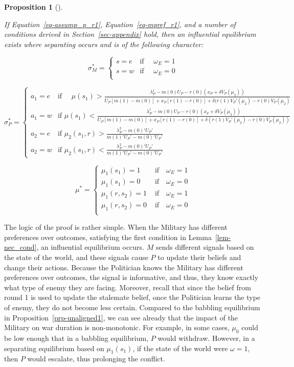\documentclass[
  12pt,
]{article}
\theoremstyle{plain}
\theoremstyle{plain}
\newtheorem{proposition}{Proposition}[section]
\theoremstyle{remark}
\begin{document}
\begin{proposition}[]\protect\hypertarget{prp-aligned1}{}\label{prp-aligned1}

If Equation~\ref{eq-assump_p_r1}, Equation~\ref{eq-mpref_r1}, and a
number of conditions derived in Section~\ref{sec-appendix} hold, then an
influential equilibrium exists where separating occurs and is of the
following character:

\[
\sigma^{*}_M = 
\begin{cases}
s = e  & \text{if } \quad \omega_E = 1\\
s = w  & \text{if } \quad \omega_E = 0 \\
\end{cases}
\]

\[
\sigma^{*}_P = 
\begin{cases}
a_1= e  & \text{if } \quad\mu(s_1)
> \frac{\lambda^1_P - m(0)U_P - r(0)(x_P + \delta V_P(\mu_2))}
 {U_P[ m(1) - m(0) ]+ x_P [r(1) -r(0)] 
 + \delta (r(1)V_P'(\mu_2) - r(0)V_P(\mu_2)}\\
a_1 = w  & \text{if } \mu(s_1)
< \frac{\lambda^1_P - m(0)U_P - r(0)(x_p + \delta V_P(\mu_2))}
 {U_P[ m(1) - m(0) ]+ x_P [r(1) -r(0)] 
 + \delta (r(1)V_P'(\mu_2) - r(0)V_P(\mu_2))}\\
a_2 = e & \text{if } \mu_2(s_1, r) > \frac{\lambda^2_P - m(0)' U_P '}{m(1)' U_P' - m(0)' U_P'}\\
a_2 = w & \text{if } \mu_2(s_1, r) < \frac{\lambda^2_P - m(0)' U_P '}{m(1)' U_P' - m(0)' U_P'}
\end{cases}
\]

\[
\mu^* = 
\begin{cases}
\mu_1(s_1) = 1 & \text{ if} \quad \omega_E = 1\\
\mu_1(s_1) = 0 & \text{ if} \quad \omega_E = 0\\
\mu_1(r, s_2) = 1 & \text{ if} \quad \omega_E = 1\\
\mu_1(r, s_2) = 0 & \text{ if} \quad \omega_E = 0\\
\end{cases}
\]

\end{proposition}

The logic of the proof is rather simple. When the Military has different
preferences over outcomes, satisfying the first condition in
Lemma~\ref{lem-nec_cond}, an influential equilibrium occurs. \(M\) sends
different signals based on the state of the world, and these signals
cause \(P\) to update their beliefs and change their actions. Because
the Politician knows the Military has different preferences over
outcomes, the signal is informative, and thus, they know exactly what
type of enemy they are facing. Moreover, recall that since the belief
from round 1 is used to update the stalemate belief, once the Politician
learns the type of enemy, they do not become less certain. Compared to
the babbling equilibrium in Proposition~\ref{prp-unaligned1}, we can see
already that the impact of the Military on war duration is
non-monotonic. For example, in some cases, \(\mu_0\) could be low enough
that in a babbling equilibrium, \(P\) would withdraw. However, in a
separating equilibrium based on \(\mu_1(s_1)\), if the state of the
world were \(\omega = 1\), then \(P\) would escalate, thus prolonging
the conflict.
\end{document}

